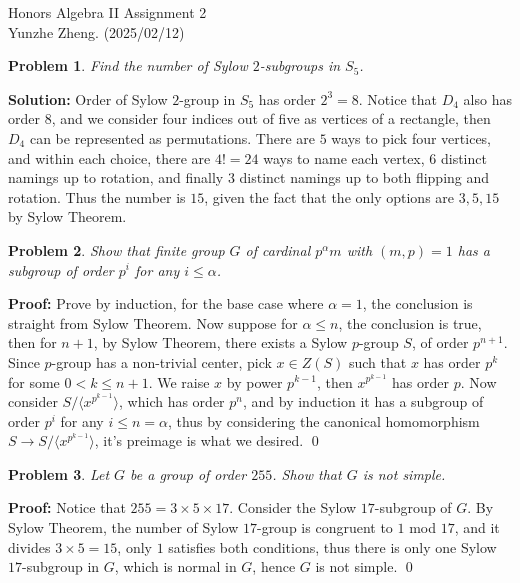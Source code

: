 \documentclass[12pt]{article}
\newtheorem{problem}{Problem}
\begin{document}
\noindent Honors Algebra II \hfill Assignment 2\\
Yunzhe Zheng. (2025/02/12)

\hrulefill

\begin{problem}
Find the number of Sylow $2$-subgroups in $S_{5}$. 
\end{problem}

\textbf{Solution:} Order of Sylow $2$-group in $S_{5}$ has order $2^3=8$. Notice that $D_{4}$ also has order $8$, and we consider four indices out of five as vertices of a rectangle, then $D_{4}$ can be represented as permutations. There are $5$ ways to pick four vertices, and within each choice, there are $4!=24$ ways to name each vertex, 6 distinct namings up to rotation, and finally $3$ distinct namings up to both flipping and rotation. Thus the number is $15$, given the fact that the only options are $3, 5, 15$ by Sylow Theorem.
\\
\begin{problem}
Show that finite group $G$ of cardinal $p^{\alpha}m$ with $(m,p)=1$ has a subgroup of order $p^{i}$ for any $i\leq \alpha$.
\end{problem}

\textbf{Proof:} Prove by induction, for the base case where $\alpha = 1$, the conclusion is straight from Sylow Theorem. Now suppose for $\alpha\leq n$, the conclusion is true, then for $n + 1$, by Sylow Theorem, there exists a Sylow $p$-group $S$, of order $p^{n+1}$. Since $p$-group has a non-trivial center, pick $x\in Z(S)$ such that $x$ has order $p^{k}$ for some $0<k\leq n + 1$. We raise $x$ by power $p^{k-1}$, then $x^{p^{k-1}}$ has order $p$. Now consider $S/\langle x^{p^{k-1}}\rangle$, which has order $p^n$, and by induction it has a subgroup of order $p^{i}$ for any $i\leq n=\alpha$, thus by considering the canonical homomorphism $S\to S/\langle x^{p^{k-1}}\rangle$, it's preimage is what we desired. \qed \\

\begin{problem}
Let $G$ be a group of order $255$. Show that $G$ is not simple.
\end{problem}

\textbf{Proof:} Notice that $255=3\times 5\times 17$. Consider the Sylow $17$-subgroup of $G$. By Sylow Theorem, the number of Sylow $17$-group is congruent to $1$ mod $17$, and it divides $3 \times 5=15$, only $1$ satisfies both conditions, thus there is only one Sylow $17$-subgroup in $G$, which is normal in $G$, hence $G$ is not simple. \qed
\end{document}
